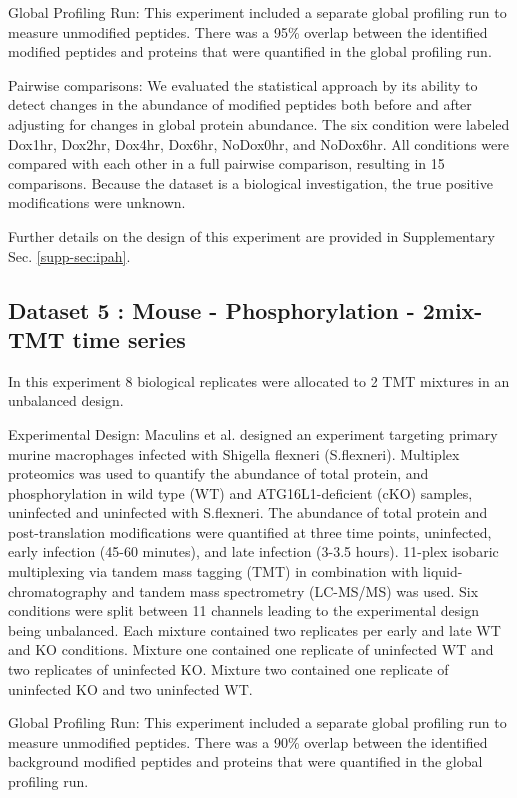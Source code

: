 \documentclass[mcp]{article}
\numberwithin{table}{section}
\begin{document}
Global Profiling Run: This experiment included a separate global profiling run to measure unmodified peptides. There was a 95\% overlap between the identified modified peptides and proteins that were quantified in the global profiling run.

Pairwise comparisons: We evaluated the statistical approach by its ability to detect changes in the abundance of modified peptides both before and after adjusting for changes in global protein abundance. The six condition were labeled Dox1hr, Dox2hr, Dox4hr, Dox6hr, NoDox0hr, and NoDox6hr. All conditions were compared with each other in a full pairwise comparison, resulting in 15 comparisons. Because the dataset is a biological investigation, the true positive modifications were unknown.

Further details on the design of this experiment are provided in Supplementary Sec. \ref{supp-sec:ipah}. 

\subsection*{Dataset 5 : Mouse - Phosphorylation - 2mix-TMT time series}
\label{sec:exp_proc_dataset5}
In this experiment 8 biological replicates were allocated to 2 TMT mixtures in an unbalanced design.

Experimental Design: Maculins et al. \cite{Maculins} designed an experiment targeting primary murine macrophages infected with Shigella flexneri (S.flexneri). Multiplex proteomics was used to quantify the abundance of total protein, and phosphorylation in wild type (WT) and ATG16L1-deficient (cKO) samples, uninfected and uninfected with S.flexneri. The abundance of total protein and post-translation modifications were quantified at three time points, uninfected, early infection (45-60 minutes), and late infection (3-3.5 hours). 11-plex isobaric multiplexing via tandem mass tagging (TMT) in combination with liquid-chromatography and tandem mass spectrometry (LC-MS/MS) was used. Six conditions were split between 11 channels leading to the experimental design being unbalanced. Each mixture contained two replicates per early and late WT and KO conditions. Mixture one contained one replicate of uninfected WT and two replicates of uninfected KO. Mixture two contained one replicate of uninfected KO and two uninfected WT.

Global Profiling Run: This experiment included a separate global profiling run to measure unmodified peptides. There was a 90\% overlap between the identified background modified peptides and proteins that were quantified in the global profiling run.
\end{document}
